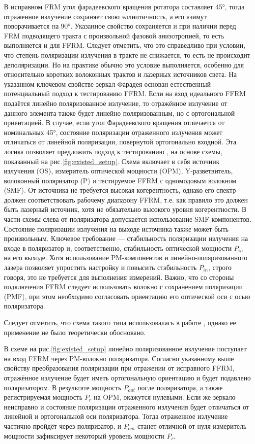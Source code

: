 \documentclass{article}
\begin{document}
В исправном FRM угол фарадеевского вращения ротатора составляет 45°, тогда отраженное излучение сохраняет свою эллиптичность, а его азимут поворачивается на 90°.
Указанное свойство сохраняется и при наличии перед FRM подводящего тракта с произвольной фазовой анизотропией, то есть выполняется и для FFRM.
Следует отметить, что это справедливо при условии, что степень поляризации излучения в тракте не снижается, то есть не происходит деполяризации.
Но на практике обычно это условие выполняется, особенно для относительно коротких волоконных трактов и лазерных источников света.
На указанном ключевом свойстве зеркал Фарадея основан естественный потенциальный подход к тестированию FFRM.
Если на вход идеального FFRM подаётся линейно поляризованное излучение, то отражённое излучение от данного элемента также будет линейно поляризованным, но с ортогональной ориентацией.
В случае, если угол Фарадеевского вращения отличается от номинальных 45°, состояние поляризации отраженного излучения может отличаться от линейной поляризации, повернутой ортогонально входной.
Эта логика позволяет предложить подход к тестированию , на основе схемы, показанный на рис.\ref{fig:existed_setup}.
Схема включает в себя источник излучения (OS), измеритель оптической мощности (OPM), Y-разветвитель, волоконный поляризатор (P) и тестируемое FFRM с одномодовым волокном (SMF).
От источника не требуется высокая когерентность, однако его спектр должен соответствовать рабочему диапазону FFRM, т.е. как правило это должен быть лазерный источник, хотя не обязательно высокого уровня когерентности.
В части схемы слева от поляризатора допускается использование SMF компонентов.
Состояние поляризации излучения на выходе источника также может быть произвольным.
Ключевое требование — стабильность поляризации излучения на входе в поляризатор и, соответственно, стабильность оптической мощности $P_{in}$ на его выходе.
Хотя использование PM-компонентов и линейно-поляризованного лазера позволяет упростить настройку и повысить стабильность $P_{in}$, строго говоря, это не требуется для выполнения измерений.
Важно, что со стороны подключения FFRM следует использовать волокно с сохранением поляризации (PMF), при этом необходимо согласовать ориентацию его оптической оси с осью поляризатора.

Следует отметить, что схема такого типа использовалась в работе \autocite{wanTwoinoneFaradayRotator2014}, однако ее применение не было теоретически обосновано.

В схеме на рис.\ref{fig:existed_setup} линейно поляризованное излучение поступает на вход FFRM  через PM-волокно поляризатора.
Согласно указанному выше свойству преобразования поляризации при отражении от исправного FFRM, отражённое излучение будет иметь ортогональную ориентацию и будет подавлено поляризатором. В результате мощность $P_{out}$ после поляризатора, а также регистрируемая мощность $P_{r}$ на OPM, окажутся нулевыми.
Если же зеркало неисправно и состояние поляризации отраженного излучения будет отличаться от линейной и ортогональной оси поляризатора.
Тогда отраженное излучение частично пройдёт через поляризатор, и $P_{out}$ станет отличной от нуля измеритель мощности зафиксирует некоторый уровень мощности $P_{r}$.
\end{document}
